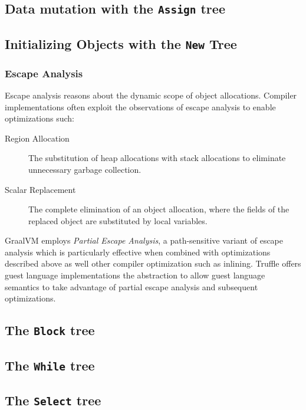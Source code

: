 \subsection{Data mutation with the \texttt{Assign} tree}

\subsection{Initializing Objects with the \texttt{New} Tree}

\subsubsection{Escape Analysis}

Escape analysis\cite{escape-analysis} reasons about the dynamic scope of object allocations. 
Compiler implementations often exploit the observations of escape analysis to enable optimizations such:

\begin{description}
	\item[Region Allocation\cite{java:escape-analysis}\cite{tofte:region-memory}] The substitution of heap allocations with stack allocations to eliminate unnecessary garbage collection.
	\item[Scalar Replacement\cite{java:escape-analysis-optimizations}] The complete elimination of an object allocation, where the fields of the replaced object are substituted by local variables.
\end{description}

GraalVM employs \textit{Partial Escape Analysis}\cite{java:partial-escape-analysis}, a path-sensitive variant of escape analysis which is particularly effective when combined with optimizations described above as well other compiler optimization such as inlining. 
Truffle offers guest language implementations the  abstraction to allow guest language semantics to take advantage of partial escape analysis and subsequent optimizations.

\subsection{The \texttt{Block} tree}

\subsection{The \texttt{While} tree}

\subsection{The \texttt{Select} tree}

